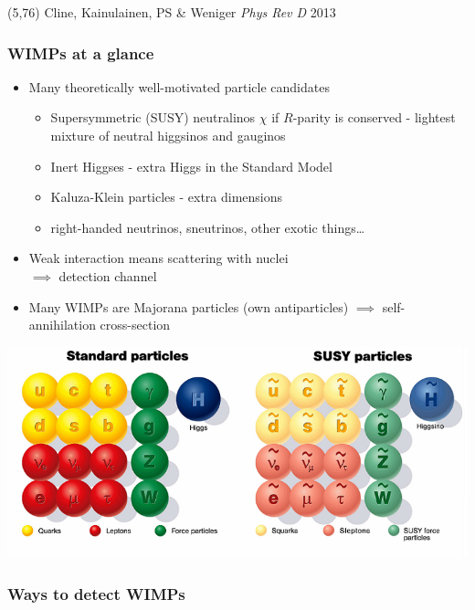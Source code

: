 \documentclass[xcolor=dvipsnames]{beamer}
\begin{document}
\begin{frame}
  \begin{textblock}{50}(5,76)
    \tiny Cline, Kainulainen, PS \& Weniger \emph{Phys Rev D} 2013
  \end{textblock}


\end{frame}


\begin{frame}
  \frametitle{WIMPs at a glance}
  
  \begin{itemize}
    \item
    Many theoretically well-motivated particle candidates 
      \begin{itemize}
        \footnotesize
        \item
          Supersymmetric (SUSY) neutralinos $\chi$ if $R$-parity is conserved - lightest mixture of neutral higgsinos and gauginos	
	\item
	  Inert Higgses - extra Higgs in the Standard Model
	\item
	  Kaluza-Klein particles - extra dimensions
	\item
 	  right-handed neutrinos, sneutrinos, other exotic things\ldots	  
       \end{itemize}
    \item
    Weak interaction means scattering with nuclei \\$\implies$ detection channel
    \item
    Many WIMPs are Majorana particles (own antiparticles) $\implies$ self-annihilation cross-section

  \end{itemize}

  \centering
  \includegraphics[width=0.64\linewidth]{susyparticles}

\end{frame}


\begin{frame}
  \frametitle{Ways to detect WIMPs}
\end{frame}
\end{document}
